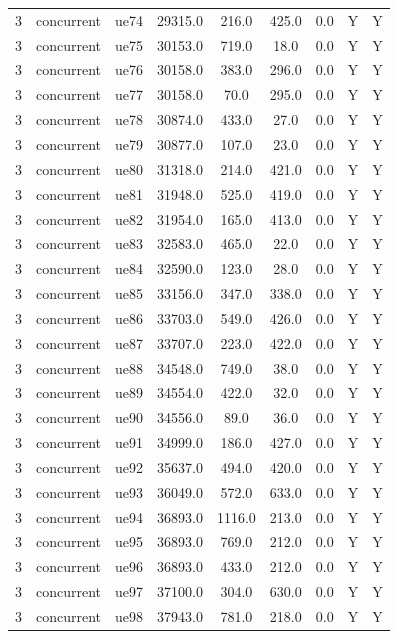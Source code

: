 \begin{table}[ht]
\begin{tabular}{|c|c|c|c|c|c|c|c|c|}
3 & concurrent & ue74 & 29315.0 & 216.0 & 425.0 & 0.0 & Y & Y \\
3 & concurrent & ue75 & 30153.0 & 719.0 & 18.0 & 0.0 & Y & Y \\
3 & concurrent & ue76 & 30158.0 & 383.0 & 296.0 & 0.0 & Y & Y \\
3 & concurrent & ue77 & 30158.0 & 70.0 & 295.0 & 0.0 & Y & Y \\
3 & concurrent & ue78 & 30874.0 & 433.0 & 27.0 & 0.0 & Y & Y \\
3 & concurrent & ue79 & 30877.0 & 107.0 & 23.0 & 0.0 & Y & Y \\
3 & concurrent & ue80 & 31318.0 & 214.0 & 421.0 & 0.0 & Y & Y \\
3 & concurrent & ue81 & 31948.0 & 525.0 & 419.0 & 0.0 & Y & Y \\
3 & concurrent & ue82 & 31954.0 & 165.0 & 413.0 & 0.0 & Y & Y \\
3 & concurrent & ue83 & 32583.0 & 465.0 & 22.0 & 0.0 & Y & Y \\
3 & concurrent & ue84 & 32590.0 & 123.0 & 28.0 & 0.0 & Y & Y \\
3 & concurrent & ue85 & 33156.0 & 347.0 & 338.0 & 0.0 & Y & Y \\
3 & concurrent & ue86 & 33703.0 & 549.0 & 426.0 & 0.0 & Y & Y \\
3 & concurrent & ue87 & 33707.0 & 223.0 & 422.0 & 0.0 & Y & Y \\
3 & concurrent & ue88 & 34548.0 & 749.0 & 38.0 & 0.0 & Y & Y \\
3 & concurrent & ue89 & 34554.0 & 422.0 & 32.0 & 0.0 & Y & Y \\
3 & concurrent & ue90 & 34556.0 & 89.0 & 36.0 & 0.0 & Y & Y \\
3 & concurrent & ue91 & 34999.0 & 186.0 & 427.0 & 0.0 & Y & Y \\
3 & concurrent & ue92 & 35637.0 & 494.0 & 420.0 & 0.0 & Y & Y \\
3 & concurrent & ue93 & 36049.0 & 572.0 & 633.0 & 0.0 & Y & Y \\
3 & concurrent & ue94 & 36893.0 & 1116.0 & 213.0 & 0.0 & Y & Y \\
3 & concurrent & ue95 & 36893.0 & 769.0 & 212.0 & 0.0 & Y & Y \\
3 & concurrent & ue96 & 36893.0 & 433.0 & 212.0 & 0.0 & Y & Y \\
3 & concurrent & ue97 & 37100.0 & 304.0 & 630.0 & 0.0 & Y & Y \\
3 & concurrent & ue98 & 37943.0 & 781.0 & 218.0 & 0.0 & Y & Y \\

\end{tabular}
\end{table}
